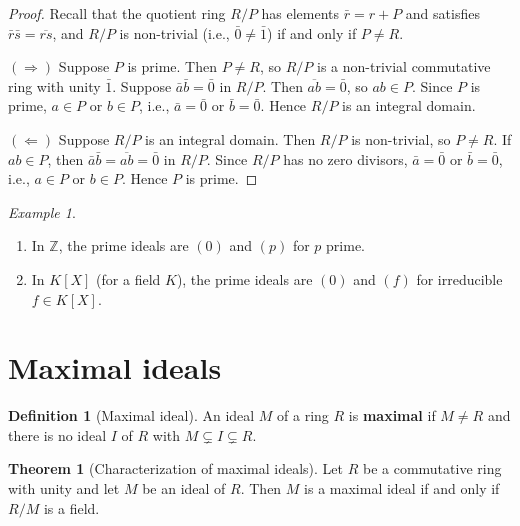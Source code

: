 \documentclass[12pt,a4paper,openany]{book}
\theoremstyle{definition}
\newtheorem{definition}{Definition}[chapter]
\newtheorem{theorem}{Theorem}[chapter]
\theoremstyle{remark}
\newtheorem{example}{Example}[chapter]
\begin{document}
\begin{proof}
Recall that the quotient ring $R/P$ has elements $\bar{r}=r+P$ and satisfies $\bar{r}\bar{s}=\overline{rs}$, and $R/P$ is non-trivial (i.e., $\bar{0}\neq\bar{1}$) if and only if $P\neq R$.

$(\Rightarrow)$ Suppose $P$ is prime. Then $P\neq R$, so $R/P$ is a non-trivial commutative ring with unity $\bar{1}$. Suppose $\bar{a}\bar{b}=\bar{0}$ in $R/P$. Then $\overline{ab}=\bar{0}$, so $ab\in P$. Since $P$ is prime, $a\in P$ or $b\in P$, i.e., $\bar{a}=\bar{0}$ or $\bar{b}=\bar{0}$. Hence $R/P$ is an integral domain.

$(\Leftarrow)$ Suppose $R/P$ is an integral domain. Then $R/P$ is non-trivial, so $P\neq R$. If $ab\in P$, then $\bar{a}\bar{b}=\overline{ab}=\bar{0}$ in $R/P$. Since $R/P$ has no zero divisors, $\bar{a}=\bar{0}$ or $\bar{b}=\bar{0}$, i.e., $a\in P$ or $b\in P$. Hence $P$ is prime.
\end{proof}

\begin{example}\label{ex:prime-ideals}
\begin{enumerate}[label=(\alph*)]
    \item In $\mathbb{Z}$, the prime ideals are $(0)$ and $(p)$ for $p$ prime.
    \item In $K[X]$ (for a field $K$), the prime ideals are $(0)$ and $(f)$ for irreducible $f\in K[X]$.
\end{enumerate}
\end{example}

\section{Maximal ideals}\label{sec:maximal-ideals}

\begin{definition}[Maximal ideal]\label{def:maximal-ideal}
An ideal $M$ of a ring $R$ is \textbf{maximal} if $M\neq R$ and there is no ideal $I$ of $R$ with $M\subsetneq I\subsetneq R$.
\end{definition}

\begin{theorem}[Characterization of maximal ideals]\label{thm:maximal-ideal-field}
Let $R$ be a commutative ring with unity and let $M$ be an ideal of $R$. Then $M$ is a maximal ideal if and only if $R/M$ is a field.
\end{theorem}
\end{document}
